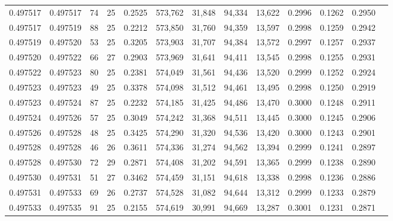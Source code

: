 \begin{tabular}{rrrrrrrrrrrrr}
0.497517 & 0.497517 &  74 &  25 &                                     0.2525 & 573,762 &  31,848 &  94,334 &  13,622 & 0.2996 & 0.1262 & 0.2950 \\
0.497517 & 0.497519 &  88 &  25 &                                     0.2212 & 573,850 &  31,760 &  94,359 &  13,597 & 0.2998 & 0.1259 & 0.2942 \\
0.497519 & 0.497520 &  53 &  25 &                                     0.3205 & 573,903 &  31,707 &  94,384 &  13,572 & 0.2997 & 0.1257 & 0.2937 \\
0.497520 & 0.497522 &  66 &  27 &                                     0.2903 & 573,969 &  31,641 &  94,411 &  13,545 & 0.2998 & 0.1255 & 0.2931 \\
0.497522 & 0.497523 &  80 &  25 &                                     0.2381 & 574,049 &  31,561 &  94,436 &  13,520 & 0.2999 & 0.1252 & 0.2924 \\
0.497523 & 0.497523 &  49 &  25 &                                     0.3378 & 574,098 &  31,512 &  94,461 &  13,495 & 0.2998 & 0.1250 & 0.2919 \\
0.497523 & 0.497524 &  87 &  25 &                                     0.2232 & 574,185 &  31,425 &  94,486 &  13,470 & 0.3000 & 0.1248 & 0.2911 \\
0.497524 & 0.497526 &  57 &  25 &                                     0.3049 & 574,242 &  31,368 &  94,511 &  13,445 & 0.3000 & 0.1245 & 0.2906 \\
0.497526 & 0.497528 &  48 &  25 &                                     0.3425 & 574,290 &  31,320 &  94,536 &  13,420 & 0.3000 & 0.1243 & 0.2901 \\
0.497528 & 0.497528 &  46 &  26 &                                     0.3611 & 574,336 &  31,274 &  94,562 &  13,394 & 0.2999 & 0.1241 & 0.2897 \\
0.497528 & 0.497530 &  72 &  29 &                                     0.2871 & 574,408 &  31,202 &  94,591 &  13,365 & 0.2999 & 0.1238 & 0.2890 \\
0.497530 & 0.497531 &  51 &  27 &                                     0.3462 & 574,459 &  31,151 &  94,618 &  13,338 & 0.2998 & 0.1236 & 0.2886 \\
0.497531 & 0.497533 &  69 &  26 &                                     0.2737 & 574,528 &  31,082 &  94,644 &  13,312 & 0.2999 & 0.1233 & 0.2879 \\
0.497533 & 0.497535 &  91 &  25 &                                     0.2155 & 574,619 &  30,991 &  94,669 &  13,287 & 0.3001 & 0.1231 & 0.2871 \\

\end{tabular}

